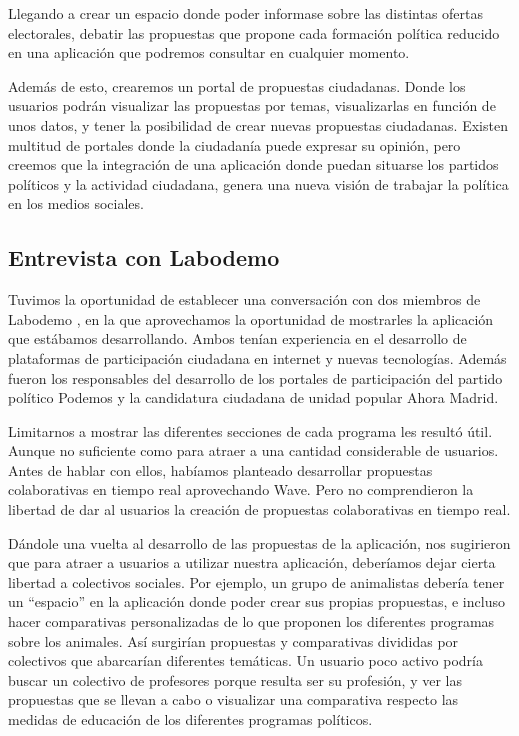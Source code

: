 Llegando a crear un espacio donde poder informase sobre las distintas ofertas electorales, debatir las propuestas que propone cada formación política reducido en una aplicación que podremos consultar en cualquier momento.

Además de esto, crearemos un portal de propuestas ciudadanas. Donde los usuarios podrán visualizar las propuestas por temas, visualizarlas en función de unos datos, y tener la posibilidad de crear nuevas propuestas ciudadanas. Existen multitud de portales donde la ciudadanía puede expresar su opinión, pero creemos que la integración de una aplicación donde puedan situarse los partidos políticos y la actividad ciudadana, genera una nueva visión de trabajar la política en los medios sociales.

\subsection{Entrevista con Labodemo}
Tuvimos la oportunidad de establecer una conversación con dos miembros de Labodemo \cite{ref:labodemo}, en la que aprovechamos la oportunidad de mostrarles la aplicación que estábamos desarrollando. Ambos tenían experiencia en el desarrollo de plataformas de participación ciudadana en internet y nuevas tecnologías. Además fueron los responsables del desarrollo de los portales de participación del partido político Podemos y la candidatura ciudadana de unidad popular Ahora Madrid.

Limitarnos a mostrar las diferentes secciones de cada programa les resultó útil. Aunque no suficiente como para atraer a una cantidad considerable de usuarios. Antes de hablar con ellos, habíamos planteado desarrollar propuestas colaborativas en tiempo real aprovechando Wave. Pero no comprendieron la libertad de dar al usuarios la creación de propuestas colaborativas en tiempo real.

Dándole una vuelta al desarrollo de las propuestas de la aplicación, nos sugirieron que para atraer a usuarios a utilizar nuestra aplicación, deberíamos dejar cierta libertad a colectivos sociales. Por ejemplo, un grupo de animalistas debería tener un “espacio” en la aplicación donde poder crear sus propias propuestas, e incluso hacer comparativas personalizadas de lo que proponen los diferentes programas sobre los animales. Así surgirían propuestas y comparativas divididas por colectivos que abarcarían diferentes temáticas. Un usuario poco activo podría buscar un colectivo de profesores porque resulta ser su profesión, y ver las propuestas que se llevan a cabo o visualizar una comparativa respecto las medidas de educación de los diferentes programas políticos.

